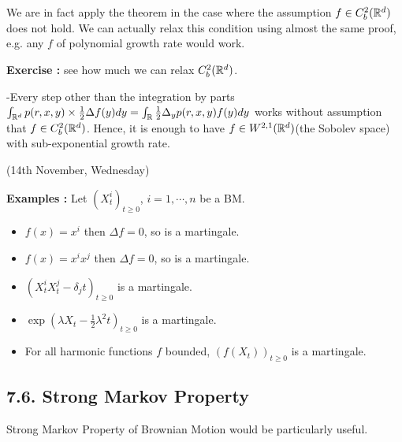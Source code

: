 \documentclass[12pt,a4paper]{report}
\newenvironment{proof}
{\begin{changemargin}{1cm}{0.5cm} 
	}%
	{\end{changemargin}
}
\begin{document}
We are in fact apply the theorem in the case where the assumption $f \in C_b^2(\mathbb{R}^d)$ does not hold. We can actually relax this condition using almost the same proof, e.g. any $f$ of polynomial growth rate would work.
\s

\textbf{Exercise :} see how much we can relax $C_b^2(\mathbb{R}^d)$.
\begin{proof}
-Every step other than the integration by parts $\int_{\mathbb{R}^d} p(r,x,y) \times \frac{1}{2} \Delta f(y) dy = \int_{\mathbb{R}} \frac{1}{2} \Delta_y p(r,x,y) f(y) dy$ works without assumption that $f\in C_b^2(\mathbb{R}^d)$. Hence, it is enough to have $f \in W^{2,1}(\mathbb{R}^d)$(the Sobolev space) with sub-exponential growth rate.
\end{proof}
\s

\newday

(14th November, Wednesday)
\s

\textbf{Examples : } Let $(X_t^i)_{t\geq 0}$, $i=1, \cdots, n$ be a BM.
\begin{itemize}
\item $f(x) = x^i$ then $\Delta f =0$, so is a martingale.
\item $f(x) = x^i x^j$ then $\Delta f=0$, so is a martingale.
\item $(X_t^i X_t^j - \delta_j t)_{t\geq 0}$ is a martingale.
\item $\exp(\lambda X_t - \frac{1}{2} \lambda^2 t)_{t\geq 0}$ is a martingale.
\item For all harmonic functions $f$ bounded, $(f(X_t))_{t\geq 0}$ is a martingale.
\end{itemize}

\subsection*{7.6. Strong Markov Property}

Strong Markov Property of Brownian Motion would be particularly useful.
\s
\end{document}
